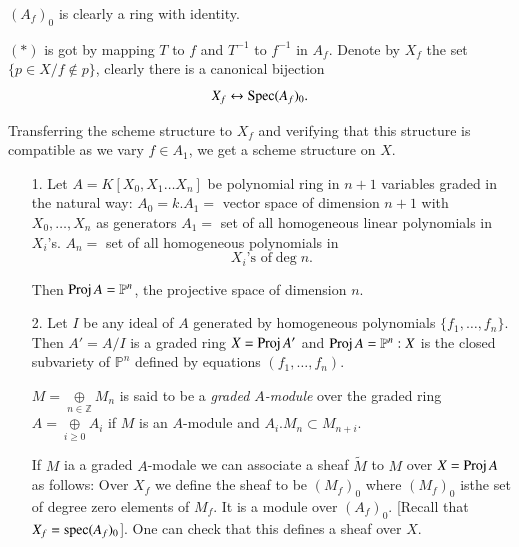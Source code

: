 $(A_f)_0$ is clearly a ring with identity.

\noindent $(*)$ is got by mapping $T$ to $f$ and $T^{-1}$ to $f^{-1}$
in $A_f$. Denote by $X_f$ the set $\{p\in X/f\notin p\}$,
clearly there is a canonical bijection
$$
X_f\leftrightarrow\operatorname{Spec}(A_f)_0.
$$

Transferring the scheme structure to $X_f$ and verifying that this
structure is compatible as we vary $f\in A_1$, we get a scheme
structure on $X$.
\begin{example*}
\begin{itemize}
\item [1.] Let $A=K[X_0,X_1\ldots X_n]$ be polynomial ring in $n+1$ variables
graded in the natural way: $A_0=k.A_1=$ vector space of dimension
$n+1$ with $X_0,\ldots,X_n$ as generators \ie $A_1=$ set of all
homogeneous linear polynomials in $X_i$'s. $A_n=$ set of all
homogeneous polynomials in 
$$
X_i\text{'s of}\deg n.
$$

Then $\operatorname{Proj} A=\mathbb{P}^n$, the projective space of dimension $n$.
\item [2.] Let $I$ be any ideal of $A$ generated by homogeneous
polynomials $\{f_1,\ldots,f_n\}$. Then $A'=A/I$ is a graded ring
$X=\operatorname{Proj} A'$ and $\operatorname{Proj} A=\mathbb{P}^n:X$ is the closed subvariety
of $\mathbb{P}^n$ defined by equations $(f_1,\ldots,f_n)$.

$M=\underset{n\in\mathbb{Z}}{\oplus}M_n$ is said to be a {\it graded
$A$-module} over the graded ring $A=\underset{i\geq 0}{\oplus}A_i$
if $M$ is an $A$-module and $A_i.M_n\subset M_{n+i}$. 

If $M$ ia a graded $A$-modale we can associate a sheaf $\tilde{M}$ to
$M$ over $X=\operatorname{Proj} A$ as follows: Over $X_f$ we define the sheaf to be
$(M_f)_0$ where $(M_f)_0$ is\pageoriginale the set of degree zero
elements of $M_f$. It is a module over $(A_f)_0$. [Recall that
$X_f=\operatorname{spec}(A_f)_0$]. One can check that this defines a sheaf over
$X$. 
\end{itemize}
\end{example*}

